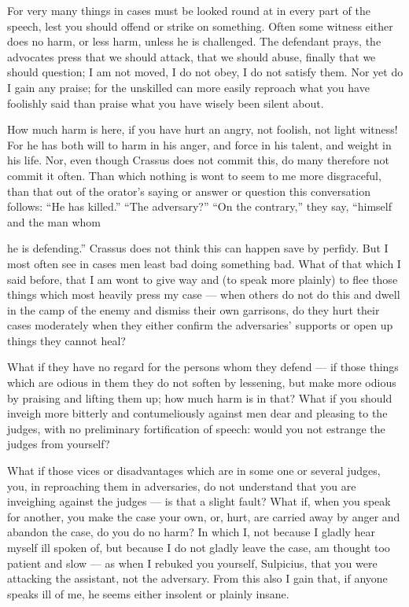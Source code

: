  For very many things in cases must be looked round at in every part of the speech, lest you should offend or strike on something. Often some witness either does no harm, or less harm, unless he is challenged. The defendant prays, the advocates press that we should attack, that we should abuse, finally that we should question; I am not moved, I do not obey, I do not satisfy them. Nor yet do I gain any praise; for the unskilled can more easily reproach what you have foolishly said than praise what you have wisely been silent about.

 How much harm is here, if you have hurt an angry, not foolish, not light witness! For he has both will to harm in his anger, and force in his talent, and weight in his life. Nor, even though Crassus does not commit this, do many therefore not commit it often. Than which nothing is wont to seem to me more disgraceful, than that out of the orator's saying or answer or question this conversation follows: ``He has killed.'' ``The adversary?'' ``On the contrary,'' they say, ``himself and the man whom

 he is defending.'' Crassus does not think this can happen save by perfidy. But I most often see in cases men least bad doing something bad. What of that which I said before, that I am wont to give way and (to speak more plainly) to flee those things which most heavily press my case — when others do not do this and dwell in the camp of the enemy and dismiss their own garrisons, do they hurt their cases moderately when they either confirm the adversaries' supports or open up things they cannot heal?

 What if they have no regard for the persons whom they defend — if those things which are odious in them they do not soften by lessening, but make more odious by praising and lifting them up; how much harm is in that? What if you should inveigh more bitterly and contumeliously against men dear and pleasing to the judges, with no preliminary fortification of speech: would you not estrange the judges from yourself?

 What if those vices or disadvantages which are in some one or several judges, you, in reproaching them in adversaries, do not understand that you are inveighing against the judges — is that a slight fault? What if, when you speak for another, you make the case your own, or, hurt, are carried away by anger and abandon the case, do you do no harm? In which I, not because I gladly hear myself ill spoken of, but because I do not gladly leave the case, am thought too patient and slow — as when I rebuked you yourself, Sulpicius, that you were attacking the assistant, not the adversary. From this also I gain that, if anyone speaks ill of me, he seems either insolent or plainly insane.

